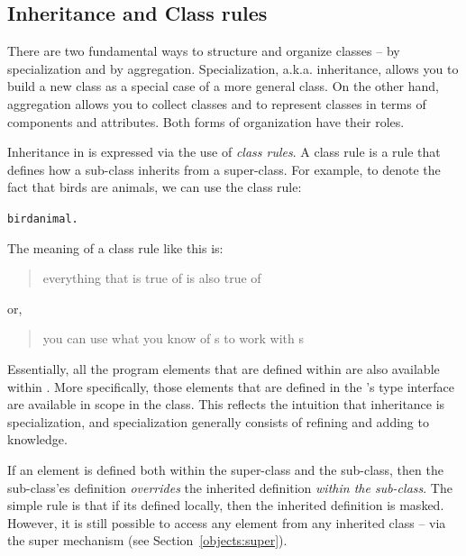 \subsection{Inheritance and Class rules}
\label{object:class rule}

There are two fundamental ways to structure and organize classes -- by specialization and by aggregation. Specialization, a.k.a. inheritance, allows you to build a new class as a special case of a more general class. On the other hand, aggregation allows you to collect classes and to represent classes in terms of components and attributes. Both forms of organization have their roles.

Inheritance in \go is expressed via the use of \emph{class rules}. A class rule is a rule that defines how a sub-class inherits from a super-class. For example, to denote the fact that birds are animals, we can use the class rule:
\begin{alltt}
bird \classarrow{} animal.
\end{alltt}
The meaning of a class rule like this is:
\begin{quote}
everything that is true of  is also true of 
\end{quote}
or, 
\begin{quote}
you can use what you know of s to work with s
\end{quote}
Essentially, all the program elements that are defined within  are also available within . More specifically, those elements that are defined in the 's type interface are available in scope in the  class. This reflects the intuition that inheritance is specialization, and specialization generally consists of refining and adding to knowledge.

If an element is defined both within the super-class and the sub-class, then the sub-class'es definition \emph{overrides} the inherited definition \emph{within the sub-class}. The simple rule is that if its defined locally, then the inherited definition is masked. However, it is still possible to access any element from any inherited class -- via the super mechanism (see Section~\vref{objects:super}).

